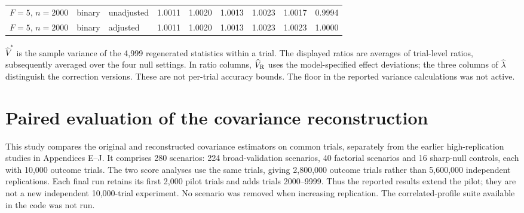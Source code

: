 \documentclass[12pt,a4paper]{article}
\theoremstyle{definition}
\theoremstyle{remark}\newtheorem{remark}{Remark}
\numberwithin{equation}{section}
\begin{document}
\begin{table}[!htbp]
\begin{threeparttable}
\begin{singlespace}
\begin{tabular}{@{}lllrrrrrr@{}}
$F=5$, $n=2000$ & binary & unadjusted & 1.0011 & 1.0020 & 1.0013 & 1.0023 & 1.0017 & 0.9994\\
$F=5$, $n=2000$ & binary & adjusted & 1.0011 & 1.0020 & 1.0013 & 1.0023 & 1.0023 & 1.0000\\
\bottomrule\end{tabular}
\begin{tablenotes}[flushleft]\small\item $\widehat V^{*}$ is the sample variance of the 4,999 regenerated statistics within a trial. The displayed ratios are averages of trial-level ratios, subsequently averaged over the four null settings. In ratio columns, $\widehat V_{\rm R}$ uses the model-specified effect deviations; the three columns of $\widehat\lambda$ distinguish the correction versions. These are not per-trial accuracy bounds. The floor in the reported variance calculations was not active.\end{tablenotes}
\end{singlespace}\end{threeparttable}\end{table}


\section{Paired evaluation of the covariance reconstruction}
This study compares the original and reconstructed covariance estimators on common trials, separately from the earlier high-replication studies in Appendices E--J. It comprises 280 scenarios: 224 broad-validation scenarios, 40 factorial scenarios and 16 sharp-null controls, each with 10,000 outcome trials. The two score analyses use the same trials, giving 2,800,000 outcome trials rather than 5,600,000 independent replications. Each final run retains its first 2,000 pilot trials and adds trials 2000--9999. Thus the reported results extend the pilot; they are not a new independent 10,000-trial experiment. No scenario was removed when increasing replication. The correlated-profile suite available in the code was not run.
\end{document}
